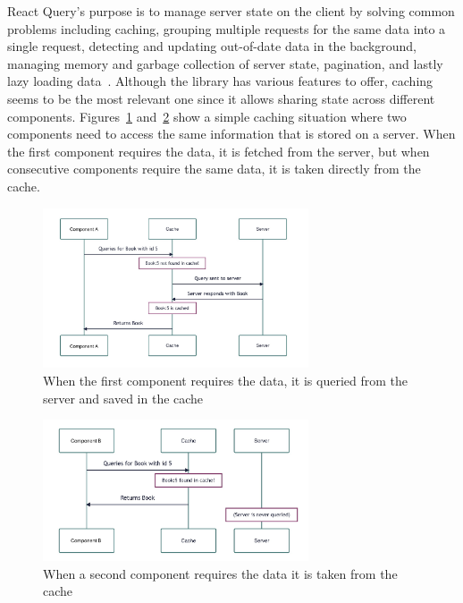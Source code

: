 React Query's purpose is to manage server state on the client
\cite{react_query_overview} by solving common
problems including caching, grouping multiple requests for the same data
into a single request, detecting and updating out-of-date data in the
background, managing memory and garbage collection of server state,
pagination, and lastly lazy loading data~\cite{react_query_overview}.
Although the library has various features to offer, caching seems to be
the most relevant one since it allows sharing state across different
components. Figures~\ref{image_cache_not_found} and~\ref{image_cache_found} show a simple caching situation where two
components need to access the same information that is stored on a
server. When the first component requires the data, it is fetched from
the server, but when consecutive components require the same data, it is
taken directly from the cache.

\begin{figure}
\centering
\includegraphics[width=0.7\textwidth]{images/Untitled.jpeg}
\caption{When the first component requires the data, it is queried from the server and saved in the cache}
\label{image_cache_not_found}
\end{figure}

\begin{figure}
\centering
\includegraphics[width=0.7\textwidth]{images/Untitled_1.jpeg}
\caption{When a second component requires the data it is taken from the cache}
\label{image_cache_found}
\end{figure}

